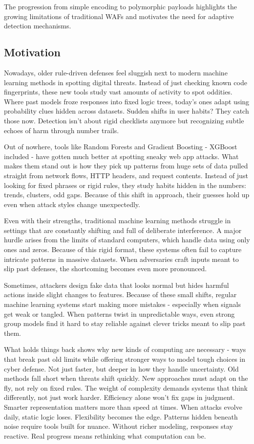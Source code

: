 \documentclass[journal,onecolumn]{IEEEtran}
\begin{document}
The progression from simple encoding to polymorphic payloads highlights the growing limitations of traditional WAFs and motivates the need for adaptive detection mechanisms.

\subsection{Motivation}
Nowadays, older rule-driven defenses feel sluggish next to modern machine learning methods in spotting digital threats. Instead of just checking known code fingerprints, these new tools study vast amounts of activity to spot oddities. Where past models froze responses into fixed logic trees, today's ones adapt using probability clues hidden across datasets. Sudden shifts in user habits? They catch those now. Detection isn't about rigid checklists anymore but recognizing subtle echoes of harm through number trails.

Out of nowhere, tools like Random Forests and Gradient Boosting - XGBoost included - have gotten much better at spotting sneaky web app attacks. What makes them stand out is how they pick up patterns from huge sets of data pulled straight from network flows, HTTP headers, and request contents. Instead of just looking for fixed phrases or rigid rules, they study habits hidden in the numbers: trends, clusters, odd gaps. Because of this shift in approach, their guesses hold up even when attack styles change unexpectedly.

Even with their strengths, traditional machine learning methods struggle in settings that are constantly shifting and full of deliberate interference. A major hurdle arises from the limits of standard computers, which handle data using only ones and zeros. Because of this rigid format, these systems often fail to capture intricate patterns in massive datasets. When adversaries craft inputs meant to slip past defenses, the shortcoming becomes even more pronounced.

Sometimes, attackers design fake data that looks normal but hides harmful actions inside slight changes to features. Because of these small shifts, regular machine learning systems start making more mistakes - especially when signals get weak or tangled. When patterns twist in unpredictable ways, even strong group models find it hard to stay reliable against clever tricks meant to slip past them.

What holds things back shows why new kinds of computing are necessary - ways that break past old limits while offering stronger ways to model tough choices in cyber defense. Not just faster, but deeper in how they handle uncertainty. Old methods fall short when threats shift quickly. New approaches must adapt on the fly, not rely on fixed rules. The weight of complexity demands systems that think differently, not just work harder. Efficiency alone won't fix gaps in judgment. Smarter representation matters more than speed at times. When attacks evolve daily, static logic loses. Flexibility becomes the edge. Patterns hidden beneath noise require tools built for nuance. Without richer modeling, responses stay reactive. Real progress means rethinking what computation can be.
\end{document}
